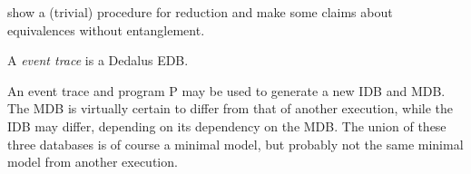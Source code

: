 show a (trivial) procedure for reduction and make some claims about equivalences without entanglement.

\begin{definition}
A \emph{event trace} is a Dedalus EDB.
\end{definition}

An event trace and program P may be used to generate a new IDB and MDB.  The MDB is virtually certain to differ from that of another
execution, while the IDB may differ, depending on its dependency on the MDB.  The union of these three databases is of course a
minimal model, but probably not the same minimal model from another execution.  



